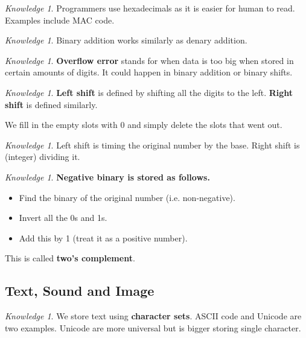 \documentclass[8pt]{article}
\theoremstyle{remark}
\newtheorem{knowledge}[method]{Knowledge}
\begin{document}
        \begin{knowledge}
            Programmers use hexadecimals as it is easier for human to read. Examples include MAC code.
        \end{knowledge}

        \begin{knowledge}
            Binary addition works similarly as denary addition.
        \end{knowledge}

        \begin{knowledge}
            \textbf{Overflow error} stands for when data is too big when stored in certain amounts of digits. It could happen in binary addition or binary shifts.
        \end{knowledge}

        \begin{knowledge}
            \textbf{Left shift} is defined by shifting all the digits to the left. \textbf{Right shift} is defined similarly.

            We fill in the empty slots with 0 and simply delete the slots that went out.
        \end{knowledge}

        \begin{knowledge}
            Left shift is timing the original number by the base. Right shift is (integer) dividing it.
        \end{knowledge}

        \begin{knowledge}
            \textbf{Negative binary is stored as follows.}
            \begin{itemize}
                \item Find the binary of the original number (i.e. non-negative).
                \item Invert all the 0s and 1s.
                \item Add this by 1 (treat it as a positive number).
            \end{itemize}
            This is called \textbf{two's complement}.
        \end{knowledge}

        \subsection{Text, Sound and Image}

        \begin{knowledge}
            We store text using \textbf{character sets}. ASCII code and Unicode are two examples. Unicode are more universal but is bigger storing single character.
        \end{knowledge}
\end{document}

